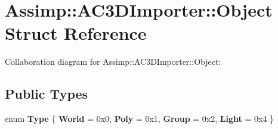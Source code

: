 \hypertarget{struct_assimp_1_1_a_c3_d_importer_1_1_object}{\section{Assimp\+:\+:A\+C3\+D\+Importer\+:\+:Object Struct Reference}
\label{struct_assimp_1_1_a_c3_d_importer_1_1_object}
}


Collaboration diagram for Assimp\+:\+:A\+C3\+D\+Importer\+:\+:Object\+:
\subsection*{Public Types}
\begin{DoxyCompactItemize}
\item 
\hypertarget{struct_assimp_1_1_a_c3_d_importer_1_1_object_a453b9a50e91c938198fc93ea8de8eae8}{enum {\bfseries Type} \{ {\bfseries World} = 0x0, 
{\bfseries Poly} = 0x1, 
{\bfseries Group} = 0x2, 
{\bfseries Light} = 0x4
 \}}\label{struct_assimp_1_1_a_c3_d_importer_1_1_object_a453b9a50e91c938198fc93ea8de8eae8}

\end{DoxyCompactItemize}
